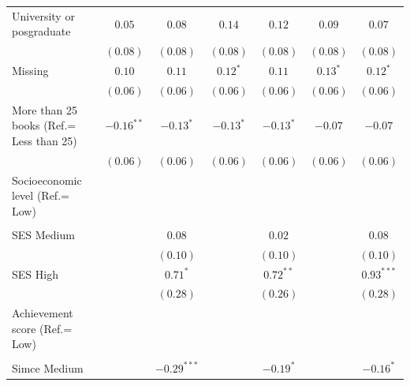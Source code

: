 \documentclass[
    behavsci,
    article,
    submit,
moreauthors
]{mdpi}
\begin{document}
\begin{table}
{\begin{center}
{\begin{threeparttable}
\begin{tabular}{l c c c c c c}
\quad University or posgraduate           & $0.05$        & $0.08$        & $0.14$        & $0.12$        & $0.09$        & $0.07$        \\
                                          & $(0.08)$      & $(0.08)$      & $(0.08)$      & $(0.08)$      & $(0.08)$      & $(0.08)$      \\
\quad Missing                             & $0.10$        & $0.11$        & $0.12^{*}$    & $0.11$        & $0.13^{*}$    & $0.12^{*}$    \\
                                          & $(0.06)$      & $(0.06)$      & $(0.06)$      & $(0.06)$      & $(0.06)$      & $(0.06)$      \\
More than 25 books (Ref.= Less than 25)   & $-0.16^{**}$  & $-0.13^{*}$   & $-0.13^{*}$   & $-0.13^{*}$   & $-0.07$       & $-0.07$       \\
                                          & $(0.06)$      & $(0.06)$      & $(0.06)$      & $(0.06)$      & $(0.06)$      & $(0.06)$      \\
Socioeconomic level (Ref.= Low)           &               &               &               &               &               &               \\
                                          &               &               &               &               &               &               \\
\quad SES Medium                          &               & $0.08$        &               & $0.02$        &               & $0.08$        \\
                                          &               & $(0.10)$      &               & $(0.10)$      &               & $(0.10)$      \\
\quad SES High                            &               & $0.71^{*}$    &               & $0.72^{**}$   &               & $0.93^{***}$  \\
                                          &               & $(0.28)$      &               & $(0.26)$      &               & $(0.28)$      \\
Achievement score (Ref.= Low)             &               &               &               &               &               &               \\
                                          &               &               &               &               &               &               \\
\quad Simce Medium                        &               & $-0.29^{***}$ &               & $-0.19^{*}$   &               & $-0.16^{*}$   \\

\end{tabular}
\end{threeparttable}}
\end{center}}
\end{table}
\end{document}

